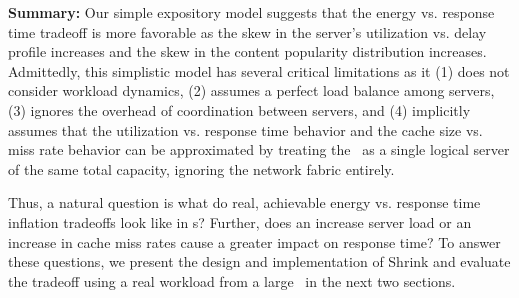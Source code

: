 \textbf{Summary:}
Our simple expository model suggests that the energy vs. response time tradeoff is more favorable as the skew in the server's utilization vs. delay profile increases and the skew in the content popularity distribution increases. Admittedly, this simplistic model has several critical limitations as it (1) does not consider workload dynamics, (2) assumes a perfect load balance among servers, (3) ignores the overhead of coordination between servers, and (4) implicitly assumes that the utilization vs. response time behavior and the cache size vs. miss rate behavior can be approximated by treating the \cdc\ as a single logical server of the same total capacity, ignoring the network fabric entirely. 

Thus, a natural question is what do real, achievable energy vs. response time inflation tradeoffs look like in \cdc s? 
Further, does an increase server load or an increase in cache miss rates cause a greater impact on response time? 
To answer these questions, we present the design and implementation of Shrink and evaluate the tradeoff using a real workload from a large \cdc\  in the next two sections.